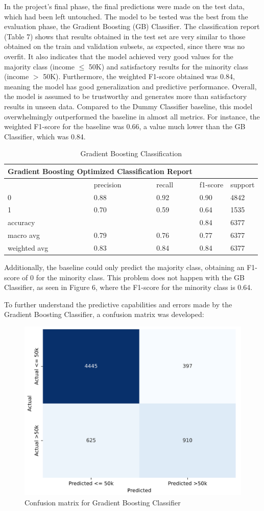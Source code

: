 \documentclass[a4paper,oneside,bibliography=totoc]{scrbook}
\begin{document}
In the project's final phase, the final predictions were made on the test data, which had been left untouched. The model to be tested was the best from the evaluation phase, the Gradient Boosting (GB) Classifier. The classification report (Table 7) shows that results obtained in the test set are very similar to those obtained on the train and validation subsets, as expected, since there was no overfit. It also indicates that the model achieved very good values for the majority class (income $\leq$ 50K) and satisfactory results for the minority class (income $>$ 50K). Furthermore, the weighted F1-score obtained was 0.84, meaning the model has good generalization and predictive performance. Overall, the model is assumed to be trustworthy and generates more than satisfactory results in unseen data. Compared to the Dummy Classifier baseline, this model overwhelmingly outperformed the baseline in almost all metrics. For instance, the weighted F1-score for the baseline was 0.66, a value much lower than the GB Classifier, which was 0.84. 
\begin{table}[h]
	\centering
	\fontsize{9}{12}\selectfont
	\begin{tabular}{|l|l|l|l|l|}
		\hline \multicolumn{3}{|c|}{\textbf{Gradient Boosting Optimized Classification Report}} & &  \\
		\hline & precision & recall & f1-score & support \\
		\hline 0 & 0.88 & 0.92 & 0.90 & 4842 \\
		\hline 1 & 0.70 & 0.59 & 0.64 & 1535 \\
		\hline accuracy & & & 0.84 & 6377 \\
		\hline macro avg & 0.79 & 0.76 & 0.77 & 6377 \\
		\hline weighted avg & 0.83 & 0.84 & 0.84 & 6377 \\
		\hline
	\end{tabular}
	\caption{Gradient Boosting Classification}
	\label{tab:t7}
\end{table}

Additionally, the baseline could only predict the majority class, obtaining an F1-score of 0 for the minority class. This problem does not happen with the GB Classifier, as seen in Figure 6, where the F1-score for the minority class is 0.64. 

To further understand the predictive capabilities and errors made by the Gradient Boosting Classifier, a confusion matrix was developed:

\begin{figure}[H]
	\centering
	\includegraphics[width=0.5\linewidth]{screenshot020}
	\caption{Confusion matrix for Gradient Boosting Classifier}
	\label{fig:screenshot020}
\end{figure}
\end{document}

